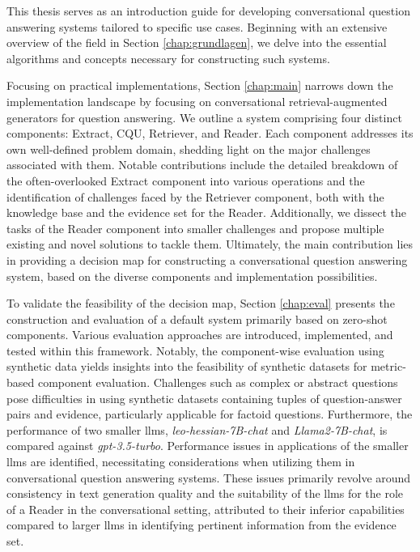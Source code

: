 This thesis serves as an introduction guide for developing conversational question answering systems tailored to specific use cases. Beginning with an extensive overview of the field in Section \ref{chap:grundlagen}, we delve into the essential algorithms and concepts necessary for constructing such systems.

Focusing on practical implementations, Section \ref{chap:main} narrows down the implementation landscape by focusing on conversational retrieval-augmented generators for question answering. We outline a system comprising four distinct components: Extract, CQU, Retriever, and Reader. Each component addresses its own well-defined problem domain, shedding light on the major challenges associated with them. Notable contributions include the detailed breakdown of the often-overlooked Extract component into various operations and the identification of challenges faced by the Retriever component, both with the knowledge base and the evidence set for the Reader. Additionally, we dissect the tasks of the Reader component into smaller challenges and propose multiple existing and novel solutions to tackle them. Ultimately, the main contribution lies in providing a decision map for constructing a conversational question answering system, based on the diverse components and implementation possibilities.

To validate the feasibility of the decision map, Section \ref{chap:eval} presents the construction and evaluation of a default system primarily based on zero-shot components. Various evaluation approaches are introduced, implemented, and tested within this framework. Notably, the component-wise evaluation using synthetic data yields insights into the feasibility of synthetic datasets for metric-based component evaluation. Challenges such as complex or abstract questions pose difficulties in using synthetic datasets containing tuples of question-answer pairs and evidence, particularly applicable for factoid questions. Furthermore, the performance of two smaller \gls{llm}s, \textit{leo-hessian-7B-chat} and \textit{Llama2-7B-chat}, is compared against \textit{gpt-3.5-turbo}. Performance issues in applications of the smaller \gls{llm}s are identified, necessitating considerations when utilizing them in conversational question answering systems. These issues primarily revolve around consistency in text generation quality and the suitability of the \gls{llm}s for the role of a Reader in the conversational setting, attributed to their inferior capabilities compared to larger \gls{llm}s in identifying pertinent information from the evidence set.

